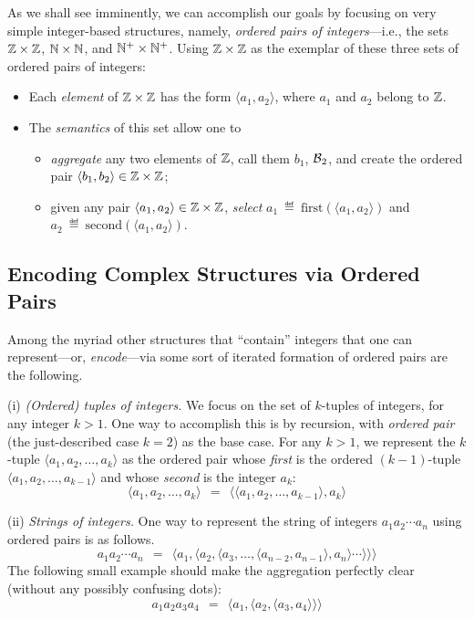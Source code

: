 As we shall see imminently, we can accomplish our goals by focusing on
very simple integer-based structures, namely, {\em ordered pairs of
  integers}---i.e.,
the sets $\mathbb{Z} \times \mathbb{Z}$, $\mathbb{N} \times \mathbb{N}$, and $\mathbb{N}^+ \times \mathbb{N}^+$.
Using $\mathbb{Z} \times \mathbb{Z}$ as the exemplar of these three sets of ordered
pairs of integers:
\begin{itemize}
\item
Each {\em element} of $\mathbb{Z} \times \mathbb{Z}$ has the form $\langle a_1, a_2
\rangle$, where $a_1$ and $a_2$ belong to $\mathbb{Z}$.
\item
The {\em semantics} of this set allow one to
  \begin{itemize}
  \item
{\em aggregate} any two elements of $\mathbb{Z}$, call them $b_1$, $\mbox{$\cal B$}_2$, and
create the ordered pair $\langle b_1, b_2 \rangle \in \mathbb{Z} \times \mathbb{Z}$;
  \item
given any pair $\langle a_1, a_2 \rangle \in \mathbb{Z} \times \mathbb{Z}$, {\em
  select} $a_1 \ \eqdef \ \mbox{first}(\langle a_1, a_2 \rangle)$ and
$a_2 \ \eqdef \ \mbox{second}(\langle a_1, a_2 \rangle)$.
  \end{itemize}
\end{itemize}

\subsection{Encoding Complex Structures via Ordered Pairs}
\label{sec:encodings-via-ordered-pairs}

Among the myriad other structures that ``contain'' integers that one
can represent---or, {\it encode}---via some sort of iterated formation
of ordered pairs are the following.

\noindent
(i) {\em (Ordered) tuples of integers.}
%
We focus on the set of $k$-tuples of integers, for any integer $k >
1$.  One way to accomplish this is by recursion, with {\em ordered
  pair} (the just-described case $k=2$) as the base case.  For any $k
> 1$, we represent the $k$-tuple $\langle a_1, a_2, \ldots, a_k
\rangle$ as the ordered pair whose {\em first} is the ordered
$(k-1)$-tuple $\langle a_1, a_2, \ldots, a_{k-1} \rangle$ and whose
{\em second} is the integer $a_k$:
\[ \langle a_1, a_2, \ldots, a_k \rangle \ \ = \ \
\langle \langle a_1, a_2, \ldots, a_{k-1} \rangle, a_k \rangle \]

\noindent
(ii) {\em Strings of integers.}
%
One way to represent the string of integers $a_1 a_2 \cdots a_n$ using
ordered pairs is as follows.
\[ a_1 a_2 \cdots a_n \ \ = \ \
\langle a_1, \langle a_2, \langle a_3, \ldots, \langle a_{n-2},  a_{n-1}
\rangle, a_n \rangle \cdots \rangle \rangle \rangle
\]
The following small example should make the aggregation perfectly
clear (without any possibly confusing dots):
\[ a_1 a_2 a_3 a_4 \ \ = \ \
\langle a_1, \langle a_2, \langle a_3,  a_4 \rangle \rangle \rangle
\]

